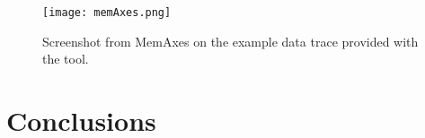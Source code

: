 \begin{figure}[htb]
    \centering
    \texttt{[image: memAxes.png]}
    \caption{Screenshot from MemAxes on the example data trace provided with the
    tool.}
    \label{fig:memaxes}
\end{figure}

%


\section{Conclusions}
\label{sec:mem-cncl}

